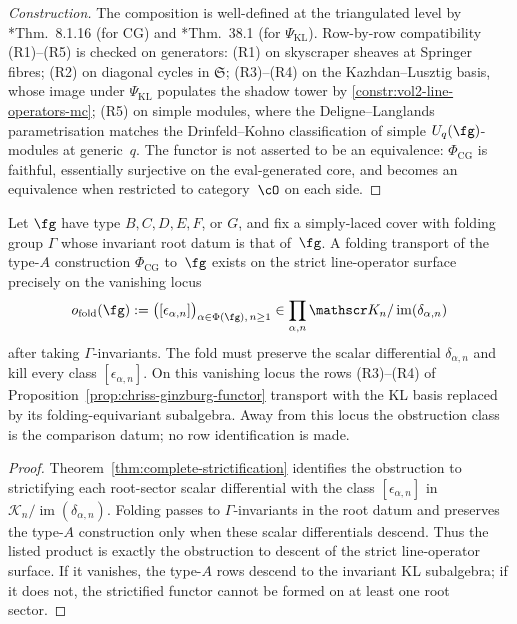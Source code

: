 \begin{proof}[Construction]
The composition is well-defined at the triangulated level
by \cite{CG97}*{Thm.\ 8.1.16} (for $\mathrm{CG}$) and
\cite{KL1}*{Thm.\ 38.1} (for $\Psi_{\mathrm{KL}}$).
Row-by-row compatibility (R1)--(R5) is checked on generators:
(R1) on skyscraper sheaves at Springer fibres; (R2) on
diagonal cycles in $\mathfrak{S}$; (R3)--(R4) on the
Kazhdan--Lusztig basis, whose image under $\Psi_{\mathrm{KL}}$
populates the shadow tower by
\eqref{constr:vol2-line-operators-mc};
(R5) on simple modules, where the Deligne--Langlands
parametrisation matches the Drinfeld--Kohno classification
of simple $U_q(\fg)$-modules at generic~$q$. The functor is
not asserted to be an equivalence: $\Phi_{\mathrm{CG}}$ is
faithful, essentially surjective on the eval-generated core,
and becomes an equivalence when restricted to
category~$\cO$ on each side.
\end{proof}

\begin{proposition}
\label{prop:cg-folding-obstruction}
Let $\fg$ have type $B,C,D,E,F$, or $G$, and fix a simply-laced
cover with folding group $\Gamma$ whose invariant root datum is that
of~$\fg$. A folding transport of the type-$A$ construction
$\Phi_{\mathrm{CG}}$ to~$\fg$ exists on the strict line-operator
surface precisely on the vanishing locus
\[
 o_{\mathrm{fold}}(\fg)
 :=
 \bigl(
 [\epsilon_{\alpha,n}]
 \bigr)_{\alpha\in\Phi(\fg),\,n\ge 1}
 \in
 \prod_{\alpha,n}
 \mathscr K_n/\operatorname{im}(\delta_{\alpha,n})
\]
after taking $\Gamma$-invariants. The fold must preserve the scalar
differential $\delta_{\alpha,n}$ and kill every class
$[\epsilon_{\alpha,n}]$. On this vanishing locus the rows
\textup{(R3)}--\textup{(R4)} of
Proposition~\ref{prop:chriss-ginzburg-functor} transport with the KL
basis replaced by its folding-equivariant subalgebra. Away from this
locus the obstruction class is the comparison datum; no row
identification is made.
\end{proposition}

\begin{proof}
Theorem~\ref{thm:complete-strictification} identifies the obstruction
to strictifying each root-sector scalar differential with the class
$[\epsilon_{\alpha,n}]$ in
$\mathscr K_n/\operatorname{im}(\delta_{\alpha,n})$. Folding passes to
$\Gamma$-invariants in the root datum and preserves the type-$A$
construction only when these scalar differentials descend. Thus the
listed product is exactly the obstruction to descent of the strict
line-operator surface. If it vanishes, the type-$A$ rows descend to
the invariant KL subalgebra; if it does not, the strictified functor
cannot be formed on at least one root sector.
\end{proof}

